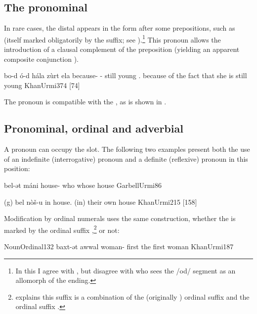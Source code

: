 
\subsection{The pronominal \prim {}} \label{ss:JUrm_od}

In rare cases, the distal \sg* \dem* {} appears in the \cst* form  after some prepositions, such as  (itself marked obligatorily by the \cst* suffix; see ).\footnote{In this I agree with \citet[374]{KhanUrmi}, but disagree with \citet[61]{GarbellUrmi} who sees the \ph/od/ segment as an allomorph of the \cst* ending.} This pronoun allows the introduction of a clausal complement of the preposition (yielding an apparent composite conjunction ).
 
{bo-d\cb{} ó-d hála zùrt \cb{}ela}
{because-\cst\cb{} \dem-\cst{} still young \cb{}\cop.\fem}
{because of the fact that she is still young}
{KhanUrmi}{374 {[74]}}

The \cst* pronoun  is compatible with the , as is shown in .



\subsection{Pronominal, ordinal and adverbial \secns}

A pronoun can occupy the \secn slot. The following two examples present both the use of an indefinite (interrogative) pronoun and a definite (reflexive) pronoun in this position:

{bel-ət máni}
{house-\cst{} who}
{whose house}
{GarbellUrmi}{86}

{(g\cb{}) bel\cb{} nòš-u}
{in\cb{} house.\cst\cb{} \pl}
{(in) their own house}
{KhanUrmi}{215 {[158]}}

Modification by ordinal numerals uses the same construction, whether the  is marked by the ordinal suffix ,\footnote{\citet[166, \S 1.22.3]{Garbell1965impact} explains this suffix is a combination of the \Sor (originally \Per) ordinal suffix  and the \Azr ordinal suffix .} or not:

\acex
{Noun}{Ordinal}{132}
{baxt-ət awwal}
{woman-\cst{} first}
{the first woman}
{KhanUrmi}{187}

